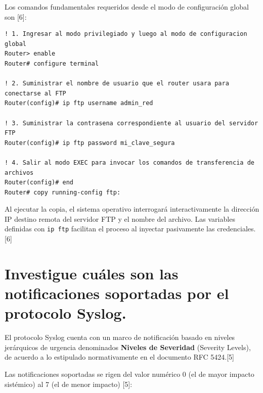 \documentclass[a4paper,12pt]{article}
\begin{document}
Los comandos fundamentales requeridos desde el modo de configuración global son [6]:

\begin{lstlisting}
! 1. Ingresar al modo privilegiado y luego al modo de configuracion global
Router> enable
Router# configure terminal

! 2. Suministrar el nombre de usuario que el router usara para conectarse al FTP
Router(config)# ip ftp username admin_red

! 3. Suministrar la contrasena correspondiente al usuario del servidor FTP
Router(config)# ip ftp password mi_clave_segura

! 4. Salir al modo EXEC para invocar los comandos de transferencia de archivos
Router(config)# end
Router# copy running-config ftp:
\end{lstlisting}

Al ejecutar la copia, el sistema operativo interrogará interactivamente la dirección IP destino remota del servidor FTP y el nombre del archivo. Las variables definidas con \texttt{ip ftp} facilitan el proceso al inyectar pasivamente las credenciales.[6]


\newpage
\section{Investigue cuáles son las notificaciones soportadas por el protocolo Syslog.}

El protocolo Syslog cuenta con un marco de notificación basado en niveles jerárquicos de urgencia denominados \textbf{Niveles de Severidad} (Severity Levels), de acuerdo a lo estipulado normativamente en el documento RFC 5424.[5] 

Las notificaciones soportadas se rigen del valor numérico 0 (el de mayor impacto sistémico) al 7 (el de menor impacto) [5]:
\end{document}
